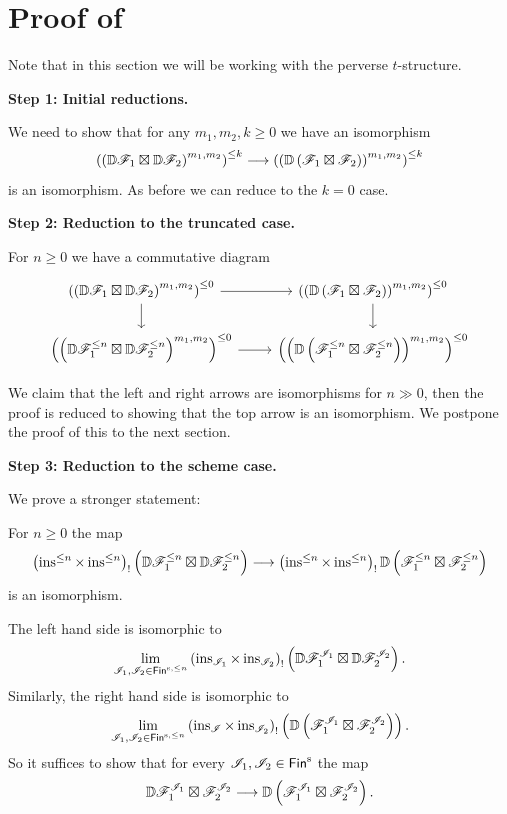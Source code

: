 \documentclass[oneside]{amsart}
\begin{document}
\section{\texorpdfstring{Proof of }{Proof of Product Theorem}}

Note that in this section we will be working with the perverse $t$-structure.

\textbf{Step 1: Initial reductions.}

We need to show that for any $m_1,m_2,k\ge 0$ we have an isomorphism
\[
\left( \left( \VD\CF_1 \boxtimes \VD\CF_2 \right) ^{m_1,m_2} \right) ^{\le k} \to \left( \left( \VD\left( \CF_1\boxtimes\CF_2 \right)  \right) ^{m_1,m_2} \right) ^{\le k}
\] 
is an isomorphism. As before we can reduce to the $k=0$ case.

\textbf{Step 2: Reduction to the truncated case.}

For $n\ge 0$ we have a commutative diagram
\[
\begin{tikzcd}
	\left( \left( \VD\CF_1\boxtimes\VD\CF_2 \right) ^{m_1,m_2} \right) ^{\le 0} \ar[r] \ar[d] & \left( \left( \VD\left( \CF_1\boxtimes\CF_2 \right)  \right) ^{m_1,m_2} \right) ^{\le 0} \ar[d] \\
	\left( \left( \VD\CF_1^{\le n}\boxtimes\VD\CF_2^{\le n} \right) ^{m_1,m_2} \right) ^{\le 0} \ar[r]  & \left( \left( \VD\left( \CF_1^{\le n}\boxtimes\CF_2^{\le n} \right)  \right) ^{m_1,m_2} \right) ^{\le 0} 
\end{tikzcd}
\] 

We claim that the left and right arrows are isomorphisms for $n\gg 0$, then the proof is reduced to showing that the top arrow is an isomorphism. We postpone the proof of this to the next section.

\textbf{Step 3: Reduction to the scheme case.}

We prove a stronger statement:
\begin{lemma}
	For $n\ge 0$ the map
	\[
	\left( \ins^{\le n}\times \ins^{\le n} \right) _! \left( \VD\CF_1^{\le n}\boxtimes\VD\CF_2^{\le n} \right) \to \left( \ins^{\le n}\times \ins^{\le n} \right) _! \VD \left( \CF_1^{\le n}\boxtimes\CF_2^{\le n} \right) 
	\] 
	is an isomorphism.
\end{lemma}
The left hand side is isomorphic to
\[
	\lim_{\CI_1,\CI_2\in \Fins[n]} \left( \ins_{\CI_1}\times \ins_{\CI_2} \right) _! \left( \VD\CF_1^{\CI_1}\boxtimes\VD\CF_2^{\CI_2} \right) .
\] 
Similarly, the right hand side is isomorphic to
\[
	\lim_{\CI_1,\CI_2\in \Fins[n]} \left( \ins_{\CI}\times \ins_{\CI_2} \right) _! \left( \VD \left( \CF_1^{\CI_1}\boxtimes\CF_2^{\CI_2} \right)  \right) .
\] 
So it suffices to show that for every $\CI_1,\CI_2\in \Fins$ the map
\[
\VD\CF_1^{\CI_1}\boxtimes \CF_2^{\CI_2} \to \VD\left( \CF_1^{\CI_1}\boxtimes\CF_2^{\CI_2} \right) .
\] 
\end{document}
